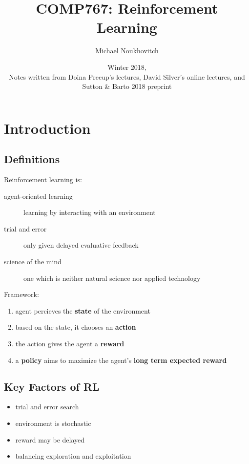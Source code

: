 \documentclass[]{article}
\theoremstyle{definition}
\begin{document}
\let\ref\Cref

\title{\bf{COMP767: Reinforcement Learning}}
\date{Winter 2018, \\ \center Notes written from Doina Precup's lectures, David Silver's online lectures, and Sutton \& Barto 2018 preprint}
\author{Michael Noukhovitch}

\maketitle
\newpage
\tableofcontents
\newpage

\section{Introduction}
\label{sec:introduction}

\subsection{Definitions}
\label{sub:definitions}
Reinforcement learning is:
\begin{description}
    \item[agent-oriented learning] learning by interacting with an environment
    \item[trial and error] only given delayed evaluative feedback
    \item[science of the mind] one which is neither natural science nor applied technology
\end{description}

Framework:
\begin{enumerate}
    \item agent percieves the \textbf{state} of the environment
    \item based on the state, it chooses an \textbf{action}
    \item the action gives the agent a \textbf{reward}
    \item a \textbf{policy} aims to maximize the agent's \textbf{long term expected reward}
\end{enumerate}


\subsection{Key Factors of RL}
\label{sub:key_factors_of_rl}
\begin{itemize}
    \item trial and error search
    \item environment is stochastic
    \item reward may be delayed
    \item balancing exploration and exploitation
\end{itemize}
\end{document}
